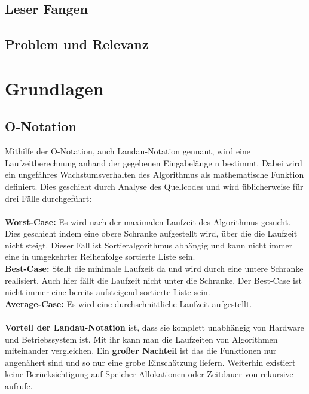 \documentclass{article}
\begin{document}
\subsection{Leser Fangen}
\subsection{Problem und Relevanz}

\section{Grundlagen}
\subsection{O-Notation}
Mithilfe der O-Notation, auch Landau-Notation gennant, wird eine Laufzeitberechnung anhand der gegebenen Eingabelänge n bestimmt. Dabei wird ein ungefähres Wachstumsverhalten des Algorithmus als mathematische Funktion definiert. Dies geschieht durch Analyse des Quellcodes und wird üblicherweise für drei Fälle durchgeführt: \cite{ONotation}\\ \\
\textbf {Worst-Case:} Es wird nach der maximalen Laufzeit des Algorithmus gesucht. Dies geschieht indem eine obere Schranke aufgestellt wird, über die die Laufzeit nicht steigt. Dieser Fall ist Sortieralgorithmus abhängig und kann nicht immer eine in umgekehrter Reihenfolge sortierte Liste sein.   \\
\textbf {Best-Case:} Stellt die minimale Laufzeit da und wird durch eine untere Schranke realisiert. Auch hier fällt die Laufzeit nicht unter die Schranke. Der Best-Case ist nicht immer eine bereits aufsteigend sortierte Liste sein.\\
\textbf {Average-Case:} Es wird eine durchschnittliche Laufzeit aufgestellt. \\ \\
\textbf{Vorteil der Landau-Notation} ist, dass sie komplett unabhängig von Hardware und Betriebssystem ist. Mit ihr kann man die Laufzeiten von Algorithmen miteinander vergleichen.
Ein \textbf{großer Nachteil} ist das die Funktionen nur angenähert sind und so nur eine grobe Einschätzung liefern. Weiterhin existiert keine Berücksichtigung auf Speicher Allokationen oder Zeitdauer von  rekursive aufrufe.
\end{document}
